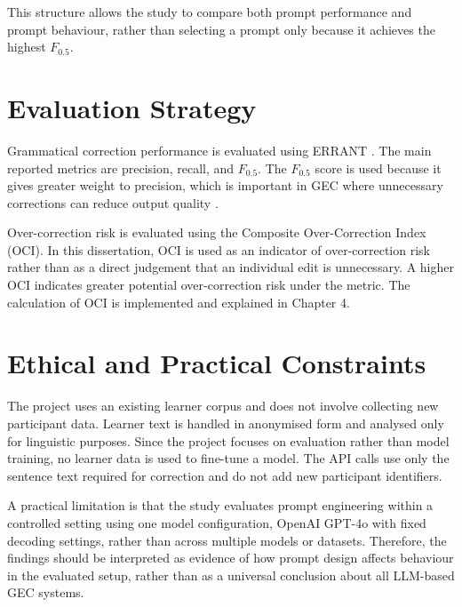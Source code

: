 This structure allows the study to compare both prompt performance and prompt behaviour, rather than selecting a prompt only because it achieves the highest $F_{0.5}$.

\section{Evaluation Strategy}

Grammatical correction performance is evaluated using ERRANT \cite{bryant-etal-2017-automatic}. The main reported metrics are precision, recall, and $F_{0.5}$. The $F_{0.5}$ score is used because it gives greater weight to precision, which is important in GEC where unnecessary corrections can reduce output quality \cite{ng-etal-2014-conll}.

Over-correction risk is evaluated using the Composite Over-Correction Index (OCI). In this dissertation, OCI is used as an indicator of over-correction risk rather than as a direct judgement that an individual edit is unnecessary. A higher OCI indicates greater potential over-correction risk under the metric. The calculation of OCI is implemented and explained in Chapter 4.

\section{Ethical and Practical Constraints}

The project uses an existing learner corpus and does not involve collecting new participant data. Learner text is handled in anonymised form and analysed only for linguistic purposes. Since the project focuses on evaluation rather than model training, no learner data is used to fine-tune a model. The API calls use only the sentence text required for correction and do not add new participant identifiers.

A practical limitation is that the study evaluates prompt engineering within a controlled setting using one model configuration, OpenAI GPT-4o with fixed decoding settings, rather than across multiple models or datasets. Therefore, the findings should be interpreted as evidence of how prompt design affects behaviour in the evaluated setup, rather than as a universal conclusion about all LLM-based GEC systems.